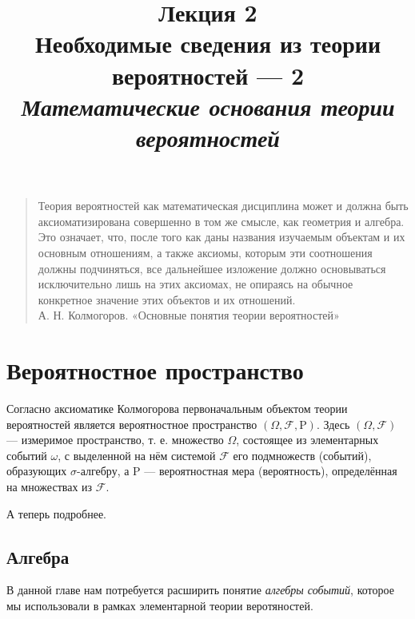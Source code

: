 \documentclass[11pt,a4paper]{article}
\title{
    Лекция 2 \\
    Необходимые сведения из теории вероятностей --- 2 \\
    \emph{\large Математические основания теории вероятностей}
  }
\begin{document}
    
\maketitle


\begin{quote}
Теория вероятностей как математическая дисциплина может и должна быть
аксиоматизирована совершенно в том же смысле, как геометрия и алгебра.
Это означает, что, после того как даны названия изучаемым объектам и их
основным отношениям, а также аксиомы, которым эти соотношения должны
подчиняться, все дальнейшее изложение должно основываться исключительно
лишь на этих аксиомах, не опираясь на обычное конкретное значение этих
объектов и их отношений.\\
А. Н. Колмогоров. «Основные понятия теории вероятностей»
\end{quote}




    \hypertarget{ux432ux435ux440ux43eux44fux442ux43dux43eux441ux442ux43dux43eux435-ux43fux440ux43eux441ux442ux440ux430ux43dux441ux442ux432ux43e}{%
\section{Вероятностное
пространство}\label{ux432ux435ux440ux43eux44fux442ux43dux43eux441ux442ux43dux43eux435-ux43fux440ux43eux441ux442ux440ux430ux43dux441ux442ux432ux43e}}

Согласно аксиоматике Колмогорова первоначальным объектом теории
вероятностей является вероятностное пространство
\((\Omega, \mathcal{F}, \mathrm{P})\). Здесь \((\Omega, \mathcal{F})\)
--- измеримое пространство, т. е. множество \(\Omega\), состоящее из
элементарных событий \(\omega\), с выделенной на нём системой
\(\mathcal{F}\) его подмножеств (событий), образующих
\(\sigma\)-алгебру, а \(\mathrm{P}\) --- вероятностная мера
(вероятность), определённая на множествах из \(\mathcal{F}\).

А теперь подробнее.

    \hypertarget{ux430ux43bux433ux435ux431ux440ux430}{%
\subsection{Алгебра}\label{ux430ux43bux433ux435ux431ux440ux430}}

В данной главе нам потребуется расширить понятие \emph{алгебры событий},
которое мы использовали в рамках элементарной теории веротяностей.
\end{document}

